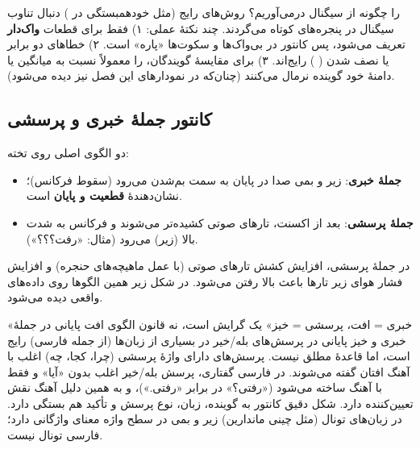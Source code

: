 \begin{addedbox}{ را چگونه از سیگنال درمی‌آوریم؟}
روش‌های رایج (مثل خودهمبستگی در ) دنبال تناوب سیگنال در پنجره‌های کوتاه می‌گردند. چند نکتهٔ عملی: ۱)  فقط برای قطعات \textbf{واک‌دار} تعریف می‌شود، پس کانتور در بی‌واک‌ها و سکوت‌ها «پاره» است. ۲) خطاهای دو برابر یا نصف شدن ( ) رایج‌اند. ۳) برای مقایسهٔ گویندگان،  را معمولاً نسبت به میانگین یا دامنهٔ خود گوینده نرمال می‌کنند (چنان‌که در نمودارهای این فصل نیز دیده می‌شود).
\end{addedbox}

\subsection{کانتور جملهٔ خبری و پرسشی}
دو الگوی اصلی روی تخته:
\begin{itemize}
  \item \textbf{جملهٔ خبری}: زیر و بمی صدا در پایان به سمت بم‌شدن می‌رود (سقوط فرکانس)؛ نشان‌دهندهٔ \textbf{قطعیت و پایان} است.
  \item \textbf{جملهٔ پرسشی}: بعد از اکسنت، تارهای صوتی کشیده‌تر می‌شوند و فرکانس به شدت بالا (زیر) می‌رود (مثال: «رفت؟؟؟»).
\end{itemize}
در جملهٔ پرسشی، افزایش کشش تارهای صوتی (با عمل ماهیچه‌های حنجره) و افزایش فشار هوای زیر تارها باعث بالا رفتن  می‌شود. در شکل زیر همین الگوها روی داده‌های واقعی دیده می‌شود.



\begin{correctionbox}{«خبری = افت، پرسشی = خیز» یک گرایش است، نه قانون}
الگوی افت پایانی در جملهٔ خبری و خیز پایانی در پرسش‌های بله/خیر در بسیاری از زبان‌ها (از جمله فارسی) رایج است، اما قاعدهٔ مطلق نیست. پرسش‌های دارای واژهٔ پرسشی (چرا، کجا، چه) اغلب با آهنگ افتان گفته می‌شوند. در فارسی گفتاری، پرسش بله/خیر اغلب بدون «آیا» و فقط با آهنگ ساخته می‌شود («رفتی؟» در برابر «رفتی.»)، و به همین دلیل آهنگ نقش تعیین‌کننده دارد. شکل دقیق کانتور به گوینده، زبان، نوع پرسش و تأکید هم بستگی دارد. در زبان‌های تونال (مثل چینی ماندارین) زیر و بمی در سطح واژه معنای واژگانی دارد؛ فارسی تونال نیست.
\end{correctionbox}

